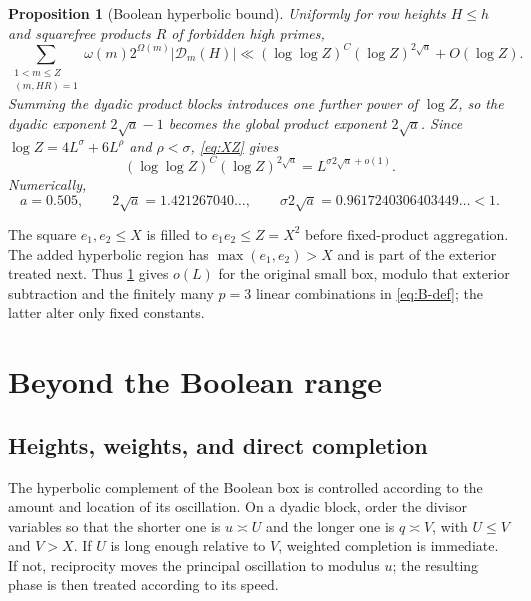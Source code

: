 \documentclass[11pt]{article}
\newtheorem{proposition}[proposition]{Proposition}
\theoremstyle{definition}
\theoremstyle{remark}
\newcommand{\Dcal}{\mathcal D}
\newcommand{\1}{\mathbf 1}
\newcommand{\Om}{\Omega}
\newcommand{\om}{\omega}
\newcommand{\llog}{\log\log}
\begin{document}
\begin{proposition}[Boolean hyperbolic bound]\label{prop:boolean-hyperbolic}
Uniformly for row heights $H\le h$ and squarefree products $R$ of forbidden high primes,
\begin{equation}\label{eq:boolean-hyperbolic}
\sum_{\substack{1<m\le Z\\(m,HR)=1}}\om(m)2^{\Om(m)}|\Dcal_m(H)|
 \ll (\llog Z)^C(\log Z)^{2\sqrt a}+O(\log Z).
\end{equation}
Summing the dyadic product blocks introduces one further power of $\log Z$, so the dyadic exponent $2\sqrt a-1$ becomes the global product exponent $2\sqrt a$.  Since $\log Z=4L^\sigma+6L^\rho$ and $\rho<\sigma$, \cref{eq:XZ} gives
\begin{equation}\label{eq:boolean-exponent}
(\llog Z)^C(\log Z)^{2\sqrt a}
 =L^{\sigma 2\sqrt a+o(1)}.
\end{equation}
Numerically,
\begin{equation}\label{eq:boolean-numerics}
a=0.505,
\qquad
2\sqrt a=1.421267040\ldots,
\qquad
\sigma 2\sqrt a=0.9617240306403449\ldots<1.
\end{equation}
\end{proposition}

The square $e_1,e_2\le X$ is filled to $e_1e_2\le Z=X^2$ before fixed-product aggregation.  The added hyperbolic region has $\max(e_1,e_2)>X$ and is part of the exterior treated next.  Thus \cref{prop:boolean-hyperbolic} gives $o(L)$ for the original small box, modulo that exterior subtraction and the finitely many $p=3$ linear combinations in \cref{eq:B-def}; the latter alter only fixed constants.

\section{Beyond the Boolean range}\label{sec:exterior}

\subsection{Heights, weights, and direct completion}\label{sec:exterior-parameters}
The hyperbolic complement of the Boolean box is controlled according to the amount and location of its oscillation.  On a dyadic block, order the divisor variables so that the shorter one is $u\asymp U$ and the longer one is $q\asymp V$, with $U\le V$ and $V>X$.  If $U$ is long enough relative to $V$, weighted completion is immediate.  If not, reciprocity moves the principal oscillation to modulus $u$; the resulting phase is then treated according to its speed.
\end{document}
